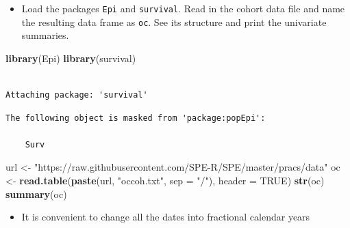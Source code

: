 \documentclass[
]{book}
\newenvironment{Shaded}{\begin{snugshade}}{\end{snugshade}}
\newcommand{\AttributeTok}[1]{\textcolor[rgb]{0.13,0.29,0.53}{#1}}
\newcommand{\ConstantTok}[1]{\textcolor[rgb]{0.56,0.35,0.01}{#1}}
\newcommand{\FunctionTok}[1]{\textcolor[rgb]{0.13,0.29,0.53}{\textbf{#1}}}
\newcommand{\NormalTok}[1]{#1}
\newcommand{\OtherTok}[1]{\textcolor[rgb]{0.56,0.35,0.01}{#1}}
\newcommand{\SpecialCharTok}[1]{\textcolor[rgb]{0.81,0.36,0.00}{\textbf{#1}}}
\newcommand{\StringTok}[1]{\textcolor[rgb]{0.31,0.60,0.02}{#1}}
\providecommand{\tightlist}{%
  \setlength{\itemsep}{0pt}\setlength{\parskip}{0pt}}
\begin{document}
\begin{itemize}
\tightlist
\item
  Load the packages \texttt{Epi} and \texttt{survival}.
  Read in the cohort data file and name
  the resulting data frame as \texttt{oc}.
  See its structure and print the univariate summaries.
\end{itemize}

\begin{Shaded}
\begin{Highlighting}[]
\FunctionTok{library}\NormalTok{(Epi)}
\FunctionTok{library}\NormalTok{(survival)}
\end{Highlighting}
\end{Shaded}

\begin{verbatim}

Attaching package: 'survival'
\end{verbatim}

\begin{verbatim}
The following object is masked from 'package:popEpi':

    Surv
\end{verbatim}

\begin{Shaded}
\begin{Highlighting}[]
\NormalTok{url }\OtherTok{\textless{}{-}} \StringTok{"https://raw.githubusercontent.com/SPE{-}R/SPE/master/pracs/data"}
\NormalTok{oc }\OtherTok{\textless{}{-}} \FunctionTok{read.table}\NormalTok{(}\FunctionTok{paste}\NormalTok{(url, }\StringTok{"occoh.txt"}\NormalTok{, }\AttributeTok{sep =} \StringTok{"/"}\NormalTok{), }\AttributeTok{header =} \ConstantTok{TRUE}\NormalTok{)}
\FunctionTok{str}\NormalTok{(oc)}
\FunctionTok{summary}\NormalTok{(oc)}
\end{Highlighting}
\end{Shaded}

\begin{itemize}
\tightlist
\item
  It is convenient to change all the dates into fractional calendar years
\end{itemize}

\begin{Shaded}
\end{Shaded}
\end{document}
